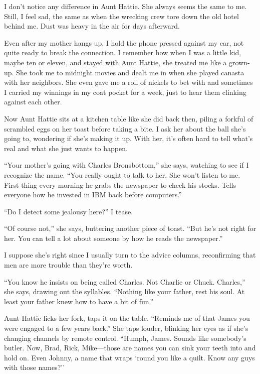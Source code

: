 \documentclass[twoside,10pt]{book}
\begin{document}
I don't notice any difference in Aunt Hattie. She always seems the same
to me. Still, I feel sad, the same as when the wrecking crew tore down
the old hotel behind me. Dust was heavy in the air for days afterward.

Even after my mother hangs up, I hold the phone pressed against my ear,
not quite ready to break the connection. I remember how when I was a
little kid, maybe ten or eleven, and stayed with Aunt Hattie, she
treated me like a grown-up. She took me to midnight movies and dealt me
in when she played canasta with her neighbors. She even gave me a roll
of nickels to bet with and sometimes I carried my winnings in my coat
pocket for a week, just to hear them clinking against each other.

Now Aunt Hattie sits at a kitchen table like she did back then, piling a
forkful of scrambled eggs on her toast before taking a bite. I ask her
about the ball she's going to, wondering if she's making it up. With
her, it's often hard to tell what's real and what she just wants to
happen.

``Your mother's going with Charles Bronsbottom,'' she says, watching to
see if I recognize the name. ``You really ought to talk to her. She
won't listen to me. First thing every morning he grabs the newspaper to
check his stocks. Tells everyone how he invested in IBM back before
computers.''

``Do I detect some jealousy here?'' I tease.

``Of course not,'' she says, buttering another piece of toast. ``But
he's not right for her. You can tell a lot about someone by how he reads
the newspaper.''

I suppose she's right since I usually turn to the advice columns,
reconfirming that men are more trouble than they're worth.

``You know he insists on being called Charles. Not Charlie or Chuck.
Charles,'' she says, draw­ing out the syllables. ``Nothing like your
father, rest his soul. At least your father knew how to have a bit of
fun.''

Aunt Hattie licks her fork, taps it on the table. ``Reminds me of that
James you were engaged to a few years back.'' She taps louder, blinking
her eyes as if she's changing channels by remote con­trol. ``Humph,
James. Sounds like somebody's butler. Now, Brad, Rick, Mike---those are
names you can sink your teeth into and hold on. Even Johnny, a name that
wraps `round you like a quilt. Know any guys with those names?''
\end{document}
